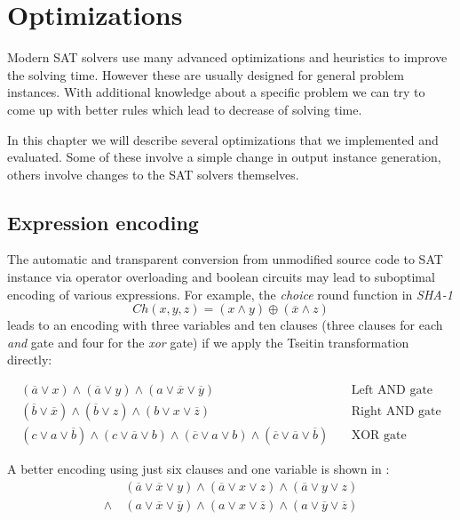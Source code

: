 \chapter{Optimizations}

Modern SAT solvers use many advanced optimizations and heuristics to improve the solving time.
However these are usually designed for general problem instances.
With additional knowledge about a specific problem we can try to come up with better rules which lead to decrease of solving time.

In this chapter we will describe several optimizations that we implemented and evaluated.
Some of these involve a simple change in output instance generation, others involve changes to the SAT solvers themselves.

\section{Expression encoding}
\label{sec:expression-encoding}
The automatic and transparent conversion from unmodified source code to SAT instance via operator overloading and boolean circuits may lead to suboptimal encoding of various expressions.
For example, the \emph{choice} round function in \emph{SHA-1}
\[
Ch(x, y, z) = (x \land y) \oplus (\overline{x} \land z)
\]
leads to an encoding with three variables and ten clauses (three clauses for each \emph{and} gate and four for the \emph{xor} gate) if we apply the Tseitin transformation directly:

\begin{align*}
(\overline{a} \lor x) \land (\overline{a} \lor y) \land (a \lor \overline{x} \lor \overline{y}) &~& \text{Left AND gate}\\
(\overline{b} \lor \overline{x}) \land (\overline{b} \lor z) \land (b \lor x \lor \overline{z})&~& \text{Right AND gate} \\
(c \lor a \lor \overline{b}) \land (c \lor \overline{a} \lor b) \land (\overline{c} \lor a \lor b) \land (\overline{c} \lor \overline{a} \lor \overline{b}) &~& \text{XOR gate}
\end{align*}

A better encoding using just six clauses and one variable is shown in \cite{nossum2012sat}:
\begin{align*}
&(\overline{a} \lor \overline{x} \lor y) \land (\overline{a} \lor x \lor z) \land (\overline{a} \lor y \lor z) \\
\land~ &(a \lor \overline{x} \lor \overline{y}) \land (a \lor x \lor \overline{z}) \land (a \lor \overline{y} \lor \overline{z})
\end{align*}

